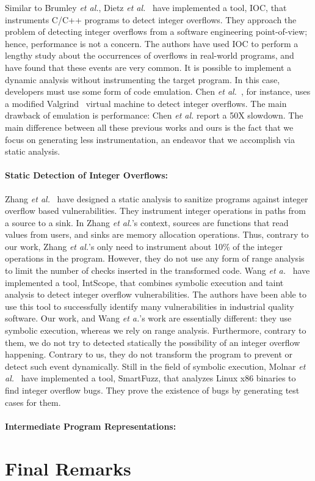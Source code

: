 \documentclass[preprint]{sigplanconf}[10pt]
\begin{document}
Similar to Brumley {\em et al.}, Dietz {\em et al.}~\cite{Dietz12} have 
implemented a tool, IOC, that instruments C/C++ programs to detect integer
overflows.
They approach the problem of detecting integer overflows from a software
engineering point-of-view; hence, performance is not a concern.
The authors have used IOC to perform a lengthy study about the occurrences
of overflows in real-world programs, and have found that these events are very
common.
It is possible to implement a dynamic analysis without instrumenting the
target program.
In this case, developers must use some form of code emulation.
Chen {\em et al.}~\cite{Chen09}, for instance, uses a modified
Valgrind~\cite{Nethercote07} virtual machine to detect integer overflows.
The main drawback of emulation is performance: Chen {\em et al.} report a
50X slowdown.
The main difference between all these previous works and ours is the fact that
we focus on generating less instrumentation, an endeavor that we accomplish via
static analysis.

\paragraph{Static Detection of Integer Overflows: }
\noindent
Zhang {\em et al.}~\cite{Zhang09} have designed a static analysis to sanitize
programs against integer overflow based vulnerabilities.
They instrument integer operations in paths from a source to a sink.
In Zhang {\em et al.}'s context, sources are functions that read values from
users, and sinks are memory allocation operations.
Thus, contrary to our work, Zhang {\em et al.}'s only need to instrument
about 10\% of the integer operations in the program.
However, they do not use any form of range analysis to limit the number of
checks inserted in the transformed code.
Wang {\em et a.}~\cite{Wang09} have implemented a tool, IntScope, that combines symbolic execution and taint analysis to detect integer overflow vulnerabilities. The authors have been able to use this tool to successfully identify many vulnerabilities in industrial quality software. Our work, and Wang {\em et a.}'s work are essentially different: they use symbolic execution, whereas we rely on
range analysis.
Furthermore, contrary to them, we do not try to detected statically the
possibility of an integer overflow happening.
Contrary to us, they do not transform the program to prevent or detect such event dynamically.
Still in the field of symbolic execution, Molnar
{\em et al.}~\cite{Molnar09} have implemented a tool, SmartFuzz, that analyzes
Linux x86 binaries to find integer overflow bugs.
They prove the existence of bugs by generating test cases for them.

\noindent
\paragraph{Intermediate Program Representations: }

\section{Final Remarks}
\label{sec:rem}



\end{document}
